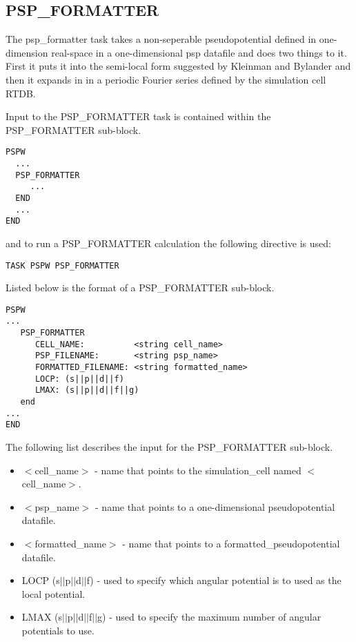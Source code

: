 \subsection{PSP\_FORMATTER}
The psp\_formatter task takes a non-seperable pseudopotential defined in
one-dimension real-space in a one-dimensional psp datafile and does two 
things to it.  First it puts it into the semi-local form suggested by 
Kleinman and Bylander and then it expands in in a periodic Fourier
series defined by the simulation cell RTDB.  

Input to the PSP\_FORMATTER task is contained
within the PSP\_FORMATTER sub-block.
\begin{verbatim}
PSPW
  ...
  PSP_FORMATTER
     ...
  END
  ...
END
\end{verbatim}
and to run a PSP\_FORMATTER calculation the following directive is used:
\begin{verbatim}
TASK PSPW PSP_FORMATTER
\end{verbatim}
Listed below is the format of a PSP\_FORMATTER sub-block.
\begin{verbatim}
PSPW
... 
   PSP_FORMATTER
      CELL_NAME:          <string cell_name> 
      PSP_FILENAME:       <string psp_name>
      FORMATTED_FILENAME: <string formatted_name>
      LOCP: (s||p||d||f)
      LMAX: (s||p||d||f||g)
   end
...
END
\end{verbatim}
The following list describes the input for the PSP\_FORMATTER
sub-block.
\begin{itemize}
	\item $<$cell\_name$>$ - name that points 
		to the simulation\_cell named $<$cell\_name$>$.
	\item $<$psp\_name$>$ - name that points
              to a one-dimensional pseudopotential datafile.
	\item $<$formatted\_name$>$ -  
 	      name that points to a formatted\_pseudopotential datafile.
  	\item LOCP (s$||$p$||$d$||$f) - used to specify which angular potential
	      is to used as the local potential.
        \item LMAX (s$||$p$||$d$||$f$||$g) - used to specify the maximum number
              of angular potentials to use.
\end{itemize}




